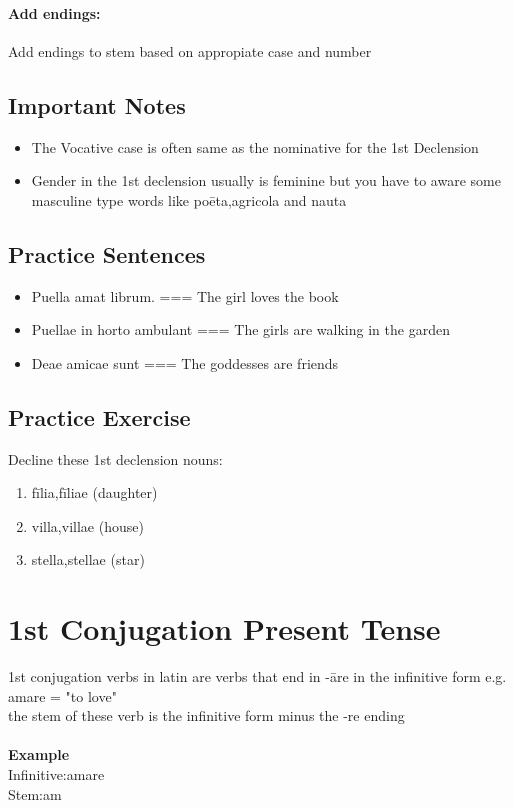 \paragraph{Add endings:}
Add endings to stem based on appropiate case and number 
\subsection*{Important Notes}
\begin{itemize}
  \item The Vocative case is often same as the nominative 
  for the 1st Declension 
  \item Gender in the 1st declension usually is feminine but
  you have to aware some masculine type words like poēta,agricola
  and nauta
\end{itemize}
\subsection*{Practice Sentences}
\begin{itemize}
  \item Puella amat librum. === The girl loves the book
  \item Puellae in horto ambulant === The girls are walking
  in the garden 
  \item Deae amicae sunt === The goddesses are friends
\end{itemize}
\subsection*{Practice Exercise}
Decline these 1st declension nouns:
\begin{enumerate}
  \item fīlia,fīliae (daughter) 
  \item villa,villae (house)
  \item stella,stellae (star)
\end{enumerate}
\section*{1st Conjugation Present Tense}
1st conjugation verbs in latin are verbs that end in -āre in 
the infinitive form e.g. amare = "to love" \\ 
the stem of these verb is the infinitive form minus the -re ending  \\ \\
\large{\textbf{Example}} \\ 
Infinitive:amare \\ 
Stem:am
